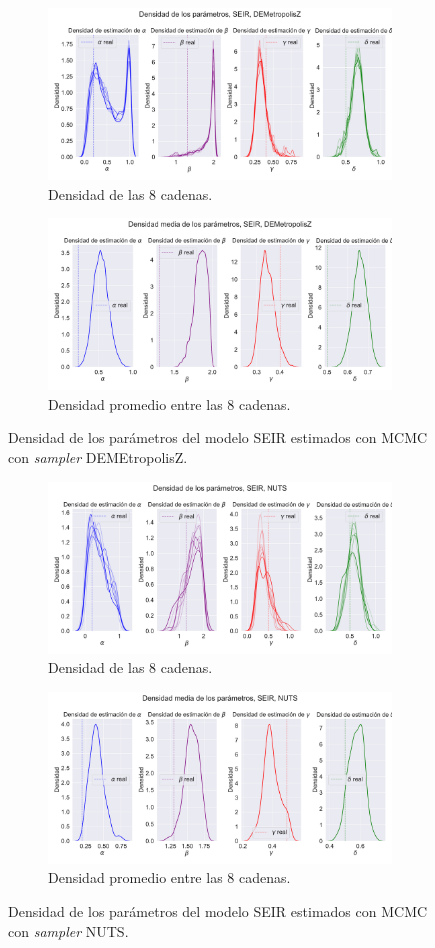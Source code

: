 \begin{figure}[h]
    \centering
    \begin{subfigure}[b]{\linewidth}
        \centering
        \includegraphics[width=0.55\linewidth]{img/content/chapter4/DEMetropolis_seir_params_density.pdf}
        \caption{Densidad de las 8 cadenas.}
    \end{subfigure}
     \begin{subfigure}[b]{\linewidth}
        \centering
        \includegraphics[width=0.55\linewidth]{img/content/chapter4/DEMetropolis_seir_params_density_mean.pdf}
        \caption{Densidad promedio entre las 8 cadenas.}
    \end{subfigure}
    \caption{Densidad de los parámetros del modelo SEIR estimados con MCMC con \textit{sampler} DEMEtropolisZ.}
\end{figure}

\begin{figure}[h]
    \centering
    \begin{subfigure}[b]{\linewidth}
        \centering
        \includegraphics[width=0.55\linewidth]{img/content/chapter4/NUTS_seir_params_density.pdf}
        \caption{Densidad de las 8 cadenas.}
    \end{subfigure}
     \begin{subfigure}[b]{\linewidth}
        \centering
        \includegraphics[width=0.55\linewidth]{img/content/chapter4/NUTS_seir_params_density_mean.pdf}
        \caption{Densidad promedio entre las 8 cadenas.}
    \end{subfigure}
    \caption{Densidad de los parámetros del modelo SEIR estimados con MCMC con \textit{sampler} NUTS.}
\end{figure}